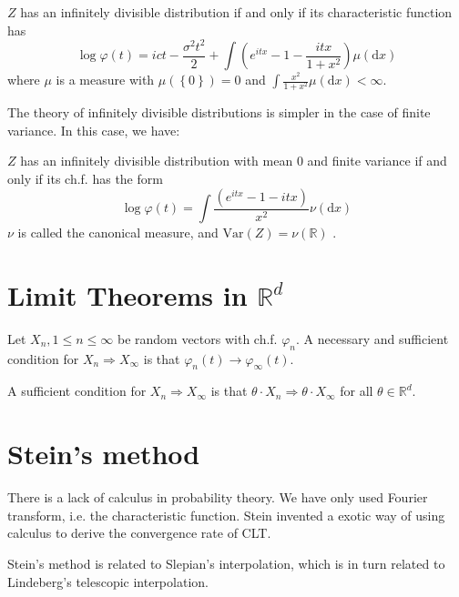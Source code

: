 \begin{theorem}
    $Z$ has an infinitely divisible distribution if and only if its characteristic function has
    \[\log \varphi(t)=ict-\frac{\sigma^2t^2}{2}+\int(e^{itx}-1-\frac{itx}{1+x^2})\mu(\mathrm{d}x)\] 
    where $\mu$ is a measure with $\mu(\left\{0\right\})=0$ and $\int\frac{x^2}{1+x^2}\mu(\mathrm{d}x)<\infty$.
\end{theorem}
The theory of infinitely divisible distributions is simpler in the case of finite variance. In this case, we have:
\begin{theorem}
    $Z$ has an infinitely divisible distribution with mean $0$ and finite variance if and only if its ch.f. has the form
    \[\log\varphi(t)=\int \frac{(e^{itx}-1-itx)}{x^2}\nu(\mathrm{d}x)\]
    $\nu$ is called the canonical measure, and $\text{Var}(Z)=\nu(\mathbb{R})$ .
\end{theorem}

\section{\texorpdfstring{Limit Theorems in $\mathbb{R}^d$}{Limit Theorems in Rd}}
\begin{theorem}
    Let $X_n,1\le n\le\infty$ be random vectors with ch.f. $\varphi_n$. A necessary and sufficient condition for $X_n\Longrightarrow X_\infty$ is that $\varphi_n(t)\to\varphi_\infty(t)$.
\end{theorem}


\begin{theorem}
    A sufficient condition for $X_n\Longrightarrow X_\infty$ is that $\theta\cdot X_n\Longrightarrow \theta\cdot X_\infty$ for all $\theta\in\mathbb{R}^d$.
\end{theorem}


\section{Stein's method}
There is a lack of calculus in probability theory. We have only used Fourier transform, i.e. the characteristic function.
Stein invented a exotic way of using calculus to derive the convergence rate of CLT.
\begin{definition}
    
\end{definition}


Stein's method is related to Slepian's interpolation, which is in turn related to Lindeberg's telescopic interpolation.
